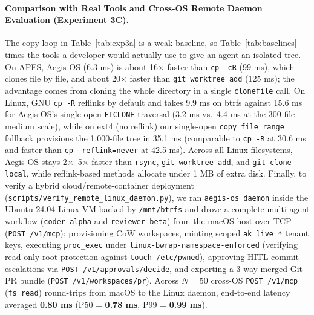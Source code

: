 \documentclass[acmsmall,screen,review]{acmart}
\begin{document}
\paragraph{Comparison with Real Tools and Cross-OS Remote Daemon Evaluation (Experiment 3C).} The copy loop in Table~\ref{tab:exp3a} is a weak baseline, so Table~\ref{tab:baselines} times the tools a developer would actually use to give an agent an isolated tree. On APFS, Aegis OS (6.3 ms) is about 16$\times$ faster than \texttt{cp -cR} (99 ms), which clones file by file, and about 20$\times$ faster than \texttt{git worktree add} (125 ms); the advantage comes from cloning the whole directory in a single \texttt{clonefile} call. On Linux, GNU \texttt{cp -R} reflinks by default and takes 9.9 ms on btrfs against 15.6 ms for Aegis OS's single-open \texttt{FICLONE} traversal (3.2 ms vs.\ 4.4 ms at the 300-file medium scale), while on ext4 (no reflink) our single-open \texttt{copy\_file\_range} fallback provisions the 1,000-file tree in 35.1 ms (comparable to \texttt{cp -R} at 30.6 ms and faster than \texttt{cp --reflink=never} at 42.5 ms). Across all Linux filesystems, Aegis OS stays 2$\times$--5$\times$ faster than \texttt{rsync}, \texttt{git worktree add}, and \texttt{git clone --local}, while reflink-based methods allocate under 1 MB of extra disk. Finally, to verify a hybrid cloud/remote-container deployment (\texttt{scripts/verify\_remote\_linux\_daemon.py}), we ran \texttt{aegis-os daemon} inside the Ubuntu 24.04 Linux VM backed by \texttt{/mnt/btrfs} and drove a complete multi-agent workflow (\texttt{coder-alpha} and \texttt{reviewer-beta}) from the macOS host over TCP (\texttt{POST /v1/mcp}): provisioning CoW workspaces, minting scoped \texttt{ak\_live\_*} tenant keys, executing \texttt{proc\_exec} under \texttt{linux-bwrap-namespace-enforced} (verifying read-only root protection against \texttt{touch /etc/pwned}), approving HITL commit escalations via \texttt{POST /v1/approvals/decide}, and exporting a 3-way merged Git PR bundle (\texttt{POST /v1/workspaces/pr}). Across $N{=}50$ cross-OS \texttt{POST /v1/mcp} (\texttt{fs\_read}) round-trips from macOS to the Linux daemon, end-to-end latency averaged \textbf{0.80 ms} (P50 = \textbf{0.78 ms}, P99 = \textbf{0.99 ms}).
\end{document}
